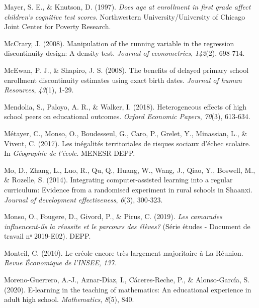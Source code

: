\documentclass[
]{book}
\newlength{\cslhangindent}
\newlength{\cslentryspacingunit} %
\newenvironment{CSLReferences}[2] %
 {%
  \setlength{\parindent}{0pt}
  \ifodd #1
  \let\oldpar\par
  \def\par{\hangindent=\cslhangindent\oldpar}
  \fi
  \setlength{\parskip}{#2\cslentryspacingunit}
 }%
 {}
\begin{document}
\begin{CSLReferences}{1}{2}
\leavevmode{}%
Mayer, S. E., \& Knutson, D. (1997). \emph{Does age at enrollment in first grade affect children's cognitive test scores}. Northwestern University/University of Chicago Joint Center for Poverty Research.

\leavevmode{}%
McCrary, J. (2008). Manipulation of the running variable in the regression discontinuity design: A density test. \emph{Journal of econometrics}, \emph{142}(2), 698‑714.

\leavevmode{}%
McEwan, P. J., \& Shapiro, J. S. (2008). The benefits of delayed primary school enrollment discontinuity estimates using exact birth dates. \emph{Journal of human Resources}, \emph{43}(1), 1‑29.

\leavevmode{}%
Mendolia, S., Paloyo, A. R., \& Walker, I. (2018). Heterogeneous effects of high school peers on educational outcomes. \emph{Oxford Economic Papers}, \emph{70}(3), 613‑634.

\leavevmode{}%
Métayer, C., Monso, O., Boudesseul, G., Caro, P., Grelet, Y., Minassian, L., \& Vivent, C. (2017). Les in{é}galit{é}s territoriales de risques sociaux d'{é}chec scolaire. In \emph{Géographie de l'école}. MENESR-DEPP.

\leavevmode{}%
Mo, D., Zhang, L., Luo, R., Qu, Q., Huang, W., Wang, J., Qiao, Y., Boswell, M., \& Rozelle, S. (2014). Integrating computer-assisted learning into a regular curriculum: Evidence from a randomised experiment in rural schools in Shaanxi. \emph{Journal of development effectiveness}, \emph{6}(3), 300‑323.

\leavevmode{}%
Monso, O., Fougere, D., Givord, P., \& Pirus, C. (2019). \emph{Les camarades influencent-ils la r{é}ussite et le parcours des {é}l{è}ves?} (Série études - Document de travail nᵒ 2019-E02). DEPP.

\leavevmode{}%
Monteil, C. (2010). Le cr{é}ole encore tr{è}s largement majoritaire {à} La R{é}union. \emph{Revue {É}conomique de l'INSEE}, \emph{137}.

\leavevmode{}%
Moreno-Guerrero, A.-J., Aznar-Díaz, I., Cáceres-Reche, P., \& Alonso-García, S. (2020). E-learning in the teaching of mathematics: An educational experience in adult high school. \emph{Mathematics}, \emph{8}(5), 840.


\end{CSLReferences}
\end{document}
